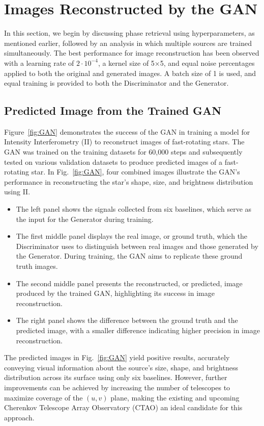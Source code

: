 \section{Images Reconstructed by the GAN}
In this section, we begin by discussing phase retrieval using hyperparameters, as mentioned earlier, followed by an analysis in which multiple sources are trained simultaneously. The best performance for image reconstruction has been observed with a learning rate of \(2 \cdot 10^{-4}\), a kernel size of 5×5, and equal noise percentages applied to both the original and generated images. A batch size of 1 is used, and equal training is provided to both the Discriminator and the Generator.

\subsection{Predicted Image from the Trained GAN}
Figure~\ref{fig:GAN} demonstrates the success of the GAN in training a model for Intensity Interferometry (II) to reconstruct images of fast-rotating stars. The GAN was trained on the training datasets for 60,000 steps and subsequently tested on various validation datasets to produce predicted images of a fast-rotating star. In Fig.~\ref{fig:GAN}, four combined images illustrate the GAN's performance in reconstructing the star’s shape, size, and brightness distribution using II.
\begin{itemize}
\item{The left panel shows the signals collected from six baselines, which serve as the input for the Generator during training.}
\item{The first middle panel displays the real image, or ground truth, which the Discriminator uses to distinguish between real images and those generated by the Generator. During training, the GAN aims to replicate these ground truth images.}
\item{The second middle panel presents the reconstructed, or predicted, image produced by the trained GAN, highlighting its success in image reconstruction.}
\item{The right panel shows the difference between the ground truth and the predicted image, with a smaller difference indicating higher precision in image reconstruction.}
\end{itemize}
The predicted images in Fig.~\ref{fig:GAN} yield positive results, accurately conveying visual information about the source's size, shape, and brightness distribution across its surface using only six baselines. However, further improvements can be achieved by increasing the number of telescopes to maximize coverage of the $(u, v)$ plane, making the existing and upcoming Cherenkov Telescope Array Observatory (CTAO) an ideal candidate for this approach.
